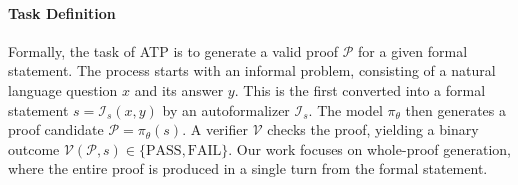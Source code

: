 \noindent\paragraph{Task Definition}
Formally, the task of ATP is to generate a valid proof $\mathcal{P}$ for a given formal statement.
The process starts with an informal problem, consisting of a natural language question $x$ and its answer $y$.
This is the first converted into a formal statement $s = \mathcal{I}_s(x,y)$ by an autoformalizer $\mathcal{I}_s$.
The model $\pi_{\theta}$ then generates a proof candidate $\mathcal{P} = \pi_{\theta}(s)$. 
A verifier $\mathcal{V}$ checks the proof, yielding a binary outcome $\mathcal{V}(\mathcal{P}, s) \in \{\text{PASS}, \text{FAIL}\}$.
Our work focuses on whole-proof generation, where the entire proof is produced in a single turn from the formal statement.


